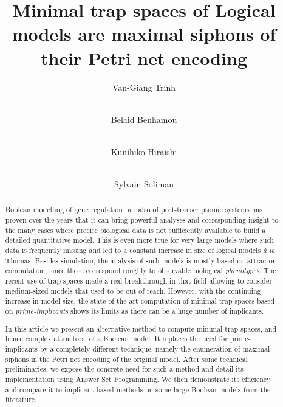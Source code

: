 \documentclass[runningheads]{llncs}
\begin{document}
\title{Minimal trap spaces of Logical models are maximal siphons of their Petri net encoding}

\author{Van-Giang Trinh \and \\
  Belaid Benhamou \and \\
  Kunihiko Hiraishi \and \\
  Sylvain Soliman
  }



\maketitle

\begin{abstract}

  Boolean modelling of gene regulation but also of post-trans\-criptomic systems has proven over the years that it can bring powerful analyses and corresponding insight to the many cases where precise biological data is not sufficiently available to build a detailed quantitative model.
  This is even more true for very large models where such data is frequently missing and led to a constant increase in size of logical models \emph{à la} Thomas.
  Besides simulation, the analysis of such models is mostly based on attractor computation, since those correspond roughly to observable biological \emph{phenotypes}. The recent use of trap spaces made a real breakthrough in that field allowing to consider medium-sized models that used to be out of reach.
  However, with the continuing increase in model-size, the state-of-the-art computation of minimal trap spaces based on \emph{prime-implicants} shows its limits as there can be a huge number of implicants.

  In this article we present an alternative method to compute minimal trap spaces, and hence complex attractors, of a Boolean model. It replaces the need for prime-implicants by a completely different technique, namely the enumeration of maximal siphons in the Petri net encoding of the original model.
  After some technical preliminaries, we expose the concrete need for such a method and detail its implementation using Answer Set Programming.
  We then demonstrate its efficiency and compare it to implicant-based methods on some large Boolean models from the literature.

\end{abstract}
\end{document}
